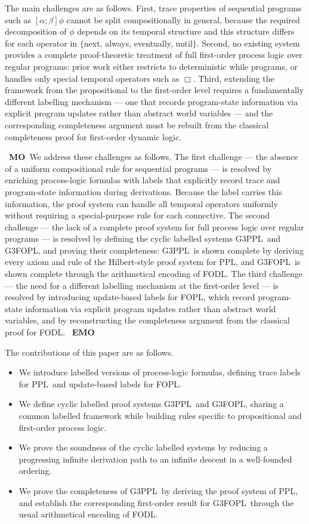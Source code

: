 \documentclass[manuscript,screen]{acmart}
\DeclareMathOperator{\seq}{;}
\newcommand{\GiiiPPLcyc}[0]{\mbox{G3PPL}}
\newcommand{\GiiiFOPLcyc}[0]{\mbox{G3FOPL}}
\newcommand{\PPL}[0]{\mbox{PPL}}
\newcommand{\FOPL}[0]{\mbox{FOPL}}
\newcommand{\FODL}[0]{\mbox{FODL}}
\newcommand{\A}[1]{\mbox{ \textbf{#1} }}
\newcommand{\MO}{\A{MO}}
\newcommand{\EMO}{\A{EMO}}
\begin{document}
\ifx
The main challenges are as follows.  First, trace properties of sequential programs such as $[\alpha\seq\beta]\phi$ cannot be split compositionally in general, because the required decomposition of $\phi$ depends on its temporal structure and this structure differs for each operator in $\{$next, always, eventually, until$\}$.  Second, no existing system provides a complete proof-theoretic treatment of full first-order process logic over regular programs: prior work either restricts to deterministic while programs, or handles only special temporal operators such as $\Box$.  Third, extending the framework from the propositional to the first-order level requires a fundamentally different labelling mechanism --- one that records program-state information via explicit program updates rather than abstract world variables --- and the corresponding completeness argument must be rebuilt from the classical completeness proof for first-order dynamic logic.

\MO We address these challenges as follows.  The first challenge --- the absence of a uniform compositional rule for sequential programs --- is resolved by enriching process-logic formulas with labels that explicitly record trace and program-state information during derivations.  Because the label carries this information, the proof system can handle all temporal operators uniformly without requiring a special-purpose rule for each connective.  The second challenge --- the lack of a complete proof system for full process logic over regular programs --- is resolved by defining the cyclic labelled systems \GiiiPPLcyc\ and \GiiiFOPLcyc, and proving their completeness: \GiiiPPLcyc\ is shown complete by deriving every axiom and rule of the Hilbert-style proof system for \PPL, and \GiiiFOPLcyc\ is shown complete through the arithmetical encoding of \FODL.  The third challenge --- the need for a different labelling mechanism at the first-order level --- is resolved by introducing update-based labels for \FOPL, which record program-state information via explicit program updates rather than abstract world variables, and by reconstructing the completeness argument from the classical proof for \FODL. \EMO
\fi

The contributions of this paper are as follows.
\begin{itemize}
\item We introduce labelled versions of process-logic formulas, defining trace labels for \PPL\ and update-based labels for \FOPL.
\item We define cyclic labelled proof systems \GiiiPPLcyc\ and \GiiiFOPLcyc, sharing a common labelled framework while building rules specific to propositional and first-order process logic.
\item We prove the soundness of the cyclic labelled systems by reducing a progressing infinite derivation path to an infinite descent in a well-founded ordering. 
\item We prove the completeness of \GiiiPPLcyc\ by deriving the proof system of \PPL, and establish the corresponding first-order result for \GiiiFOPLcyc\ through the usual arithmetical encoding of \FODL.
\end{itemize}
\end{document}
